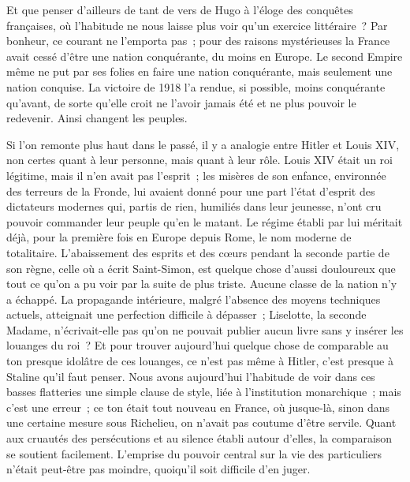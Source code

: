 \documentclass[french,twoside]{book} %
\begin{document}
\noindent Et que penser d'ailleurs de tant de vers de Hugo à l'éloge des conquêtes françaises, où l'habitude ne nous laisse plus voir qu'un exercice littéraire ? Par bonheur, ce courant ne l'emporta pas ; pour des raisons mystérieuses la France avait cessé d'être une nation conquérante, du moins en Europe. Le second Empire même ne put par ses folies en faire une nation conquérante, mais seulement une nation conquise. La victoire de 1918 l'a rendue, si possible, moins conquérante qu'avant, de sorte qu'elle croit ne l'avoir jamais été et ne plus pouvoir le redevenir. Ainsi changent les peuples.\par
Si l'on remonte plus haut dans le passé, il y a analogie entre Hitler et Louis XIV, non certes quant à leur personne, mais quant à leur rôle. Louis XIV était un roi légitime, mais il n'en avait pas l'esprit ; les misères de son enfance, environnée des terreurs de la Fronde, lui avaient donné pour une part l'état d'esprit des dictateurs modernes qui, partis de rien, humiliés dans leur jeu­nesse, n'ont cru pouvoir commander leur peuple qu'en le matant. Le régime établi par lui méritait déjà, pour la première fois en Europe depuis Rome, le nom moderne de totalitaire. L'abaissement des esprits et des cœurs pendant la seconde partie de son règne, celle où a écrit Saint-Simon, est quelque chose d'aussi douloureux que tout ce qu'on a pu voir par la suite de plus triste. Aucune classe de la nation n'y a échappé. La propagande intérieure, malgré l'absence des moyens techniques actuels, atteignait une perfection difficile à dépasser ; Liselotte, la seconde Madame, n'écrivait-elle pas qu'on ne pouvait publier aucun livre sans y insérer les louanges du roi ? Et pour trouver aujour­d'hui quelque chose de comparable au ton presque idolâtre de ces louanges, ce n'est pas même à Hitler, c'est presque à Staline qu'il faut penser. Nous avons aujourd'hui l'habitude de voir dans ces basses flatteries une simple clause de style, liée à l'institution monarchique ; mais c'est une erreur ; ce ton était tout nouveau en France, où jusque-là, sinon dans une certaine mesure sous Richelieu, on n'avait pas coutume d'être servile. Quant aux cruautés des persé­cutions et au silence établi autour d'elles, la comparaison se soutient facile­ment. L'emprise du pouvoir central sur la vie des particuliers n'était peut-être pas moindre, quoiqu'il soit difficile d'en juger.\par
\end{document}
